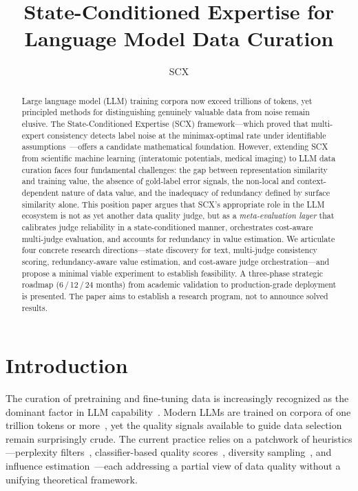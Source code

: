 \documentclass[11pt,twocolumn]{article}
\title{State-Conditioned Expertise for Language Model Data Curation}
\author{SCX}
\begin{document}
\maketitle

\begin{abstract}
Large language model (LLM) training corpora now exceed trillions of tokens, yet principled methods for distinguishing genuinely valuable data from noise remain elusive. The State-Conditioned Expertise (SCX) framework---which proved that multi-expert consistency detects label noise at the minimax-optimal rate under identifiable assumptions~\cite{scx2026}---offers a candidate mathematical foundation. However, extending SCX from scientific machine learning (interatomic potentials, medical imaging) to LLM data curation faces four fundamental challenges: the gap between representation similarity and training value, the absence of gold-label error signals, the non-local and context-dependent nature of data value, and the inadequacy of redundancy defined by surface similarity alone. This position paper argues that SCX's appropriate role in the LLM ecosystem is not as yet another data quality judge, but as a \textit{meta-evaluation layer} that calibrates judge reliability in a state-conditioned manner, orchestrates cost-aware multi-judge evaluation, and accounts for redundancy in value estimation. We articulate four concrete research directions---state discovery for text, multi-judge consistency scoring, redundancy-aware value estimation, and cost-aware judge orchestration---and propose a minimal viable experiment to establish feasibility. A three-phase strategic roadmap (6\,/\,12\,/\,24 months) from academic validation to production-grade deployment is presented. The paper aims to establish a research program, not to announce solved results.
\end{abstract}

\section{Introduction}

The curation of pretraining and fine-tuning data is increasingly recognized as the dominant factor in LLM capability~\cite{gunasekar2023textbooks,zhou2024web,Brown2020}. Modern LLMs are trained on corpora of one trillion tokens or more~\cite{raffel2020,gao2020pile}, yet the quality signals available to guide data selection remain surprisingly crude. The current practice relies on a patchwork of heuristics---perplexity filters~\cite{wenzek2020quality}, classifier-based quality scores~\cite{penedo2023refinedweb}, diversity sampling~\cite{xie2023dsir}, and influence estimation~\cite{pruthi2020estimating,koh2017influence}---each addressing a partial view of data quality without a unifying theoretical framework.
\end{document}
